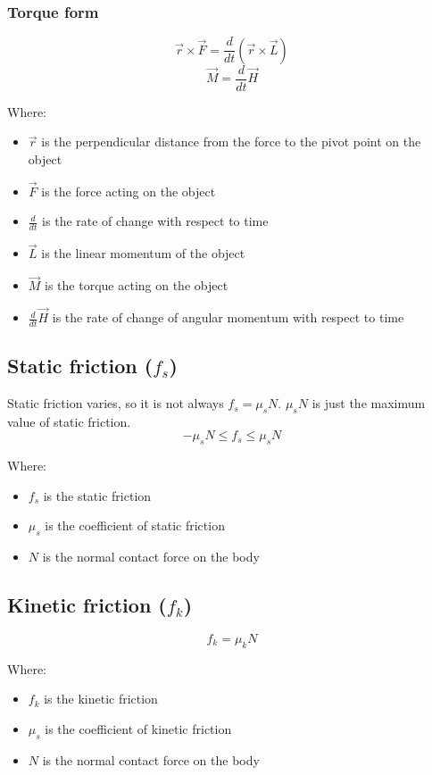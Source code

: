\documentclass[11pt]{article}
\begin{document}
\subsubsection{Torque form}
\label{sec:orgd74a3cd}
\[\vec{r} \times \vec{F} = \frac{d}{dt} \left(\vec{r} \times \vec{L} \right)\]
\[\vec{M} = \frac{d}{dt} \vec{H}\]

Where:
\begin{itemize}
\item \(\vec{r}\) is the perpendicular distance from the force to the pivot point on the object
\item \(\vec{F}\) is the force acting on the object
\item \(\frac{d}{dt}\) is the rate of change with respect to time
\item \(\vec{L}\) is the linear momentum of the object
\item \(\vec{M}\) is the torque acting on the object
\item \(\frac{d}{dt} \vec{H}\) is the rate of change of angular momentum with respect to time
\end{itemize}

 \newpage

\subsection{Static friction (\(f_s\))}
\label{sec:org8fc2dc1}
Static friction varies, so it is not always \(f_s = \mu_s N\).
\(\mu_s N\) is just the maximum value of static friction.
\[-\mu_s N \le f_s \le \mu_s N\]

Where:
\begin{itemize}
\item \(f_s\) is the static friction
\item \(\mu_s\) is the coefficient of static friction
\item \(N\) is the normal contact force on the body
\end{itemize}

\subsection{Kinetic friction (\(f_k\))}
\label{sec:org1f77826}
\[f_k = \mu_k N\]

Where:
\begin{itemize}
\item \(f_k\) is the kinetic friction
\item \(\mu_s\) is the coefficient of kinetic friction
\item \(N\) is the normal contact force on the body
\end{itemize}
\end{document}
